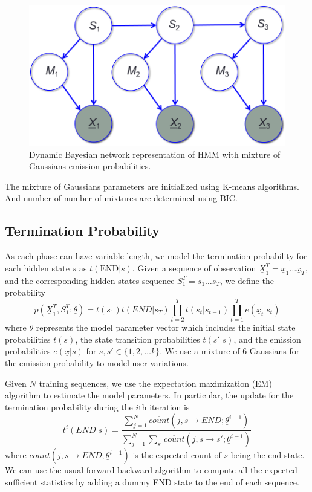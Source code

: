 \begin{figure}
\centering
\includegraphics[width=0.5\columnwidth]{figures/mog.png}
\caption{Dynamic Bayesian network representation of HMM with mixture of
Gaussians emission probabilities.}
\end{figure}

The mixture of Gaussians parameters are initialized using K-means algorithms.
And number of number of mixtures are determined using BIC.

\subsection{Termination Probability}
As each phase can have variable length, we model the termination probability for each
hidden state $s$ as $t(\text{END}|s)$. Given a sequence of observation $\underline{X}_1^T = \underline{x}_1\ldots\underline{x}_T$, and 
the corresponding hidden states sequence $S_1^T = s_1\ldots s_T$, we define the probability
\begin{displaymath}
p(\underline{X}_1^T, S_1^T;\underline{\theta}) = 
    t(s_1)t(END|s_T)\prod_{t = 2}^T t(s_t | s_{t-1})\prod_{t = 1}^T e(\underline{x}_t|s_t)
\end{displaymath}
where $\underline{\theta}$ represents the model parameter vector which includes
the initial state probabilities $t(s)$, the state transition probabilities $t(s'|s)$, and the 
emission probabilities $e(\underline{x}|s)$ for $s, s'\in \{1, 2,\ldots k\}$. 
We use a mixture of 6 Gaussians for the emission probability to model user variations.

Given $N$ training sequences, we use the expectation maximization (EM) algorithm to estimate the model parameters. In
particular, the update for the termination probability during the $i$th iteration is 
\begin{displaymath}
t^i(END|s) = \frac{\sum_{j = 1}^N \overline{count}(j, s\rightarrow END;\underline{\theta}^{i-1})}
    {\sum_{j = 1}^N\sum_{s'} \overline{count}(j, s\rightarrow s';\underline{\theta}^{i-1})}
\end{displaymath}
where $\overline{count}(j, s\rightarrow END;\underline{\theta}^{i-1})$ is the expected count of 
$s$ being the end state. We can use the usual forward-backward algorithm to compute all the 
expected sufficient statistics by adding a dummy END state to the end of each sequence.

